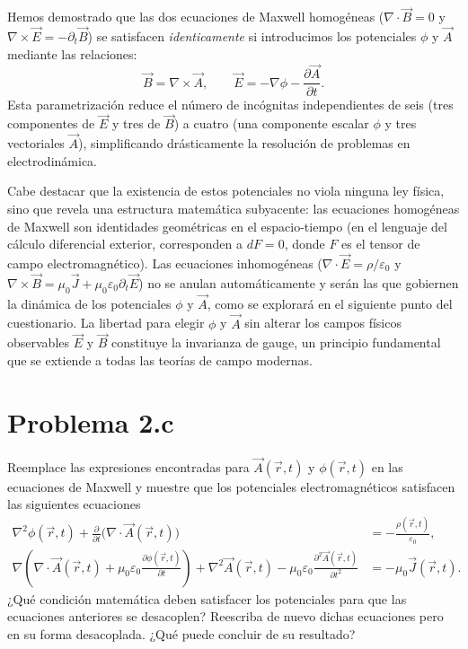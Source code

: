 \documentclass[a4paper]{article}
\begin{document}
Hemos demostrado que las dos ecuaciones de Maxwell homogéneas ($\nabla \cdot \vec{B}=0$ y $\nabla \times \vec{E} = -\partial_t \vec{B}$) se satisfacen \textit{identicamente} si introducimos los potenciales $\phi$ y $\vec{A}$ mediante las relaciones:
$$
\vec{B} = \nabla \times \vec{A}, \qquad \vec{E} = -\nabla \phi - \frac{\partial \vec{A}}{\partial t}.
$$
Esta parametrización reduce el número de incógnitas independientes de seis (tres componentes de $\vec{E}$ y tres de $\vec{B}$) a cuatro (una componente escalar $\phi$ y tres vectoriales $\vec{A}$), simplificando drásticamente la resolución de problemas en electrodinámica. 

Cabe destacar que la existencia de estos potenciales no viola ninguna ley física, sino que revela una estructura matemática subyacente: las ecuaciones homogéneas de Maxwell son identidades geométricas en el espacio-tiempo (en el lenguaje del cálculo diferencial exterior, corresponden a $dF=0$, donde $F$ es el tensor de campo electromagnético). Las ecuaciones inhomogéneas ($\nabla \cdot \vec{E} = \rho/\varepsilon_0$ y $\nabla \times \vec{B} = \mu_0 \vec{J} + \mu_0\varepsilon_0 \partial_t \vec{E}$) no se anulan automáticamente y serán las que gobiernen la dinámica de los potenciales $\phi$ y $\vec{A}$, como se explorará en el siguiente punto del cuestionario. La libertad para elegir $\phi$ y $\vec{A}$ sin alterar los campos físicos observables $\vec{E}$ y $\vec{B}$ constituye la invarianza de gauge, un principio fundamental que se extiende a todas las teorías de campo modernas.



\section{Problema 2.c}
Reemplace las expresiones encontradas para $\vec{A}(\vec{r},t)$ y $\phi(\vec{r},t)$ en las ecuaciones de Maxwell y muestre que los potenciales electromagnéticos satisfacen las siguientes ecuaciones
\begin{align}
\nabla^2\phi(\vec{r},t) + \frac{\partial}{\partial t}\big(\nabla \cdot \vec{A}(\vec{r},t)\big)
&= -\frac{\rho(\vec{r},t)}{\varepsilon_0}, \\
\nabla\left(\nabla \cdot \vec{A}(\vec{r},t) + \mu_0\varepsilon_0\frac{\partial \phi(\vec{r},t)}{\partial t}\right)
+
\nabla^2\vec{A}(\vec{r},t)
- \mu_0\varepsilon_0\frac{\partial^2 \vec{A}(\vec{r},t)}{\partial t^2}
&= -\mu_0\vec{J}(\vec{r},t).
\end{align}
¿Qué condición matemática deben satisfacer los potenciales para que las ecuaciones anteriores se desacoplen? Reescriba de nuevo dichas ecuaciones pero en su forma desacoplada. ¿Qué puede concluir de su resultado?
\end{document}
